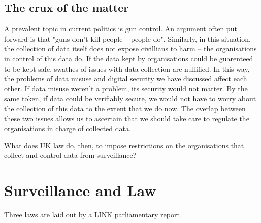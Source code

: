 \documentclass[10pt, draft]{article}
\begin{document}
\subsection{The crux of the matter}\par
A prevalent topic in current politics is gun control. An argument often put forward is that "guns don't kill people -- people do". Similarly, in this situation, the collection of data itself does not expose civillians to harm -- the organisations in control of this data do. If the data kept by organisations could be guarenteed to be kept safe, swathes of issues with data collection are nullified. In this way, the problems of data misuse and digital security we have discussed affect each other. If data misuse weren't a problem, its security would not matter. By the same token, if data could be verifiably secure, we would not have to worry about the collection of this data to the extent that we do now. The overlap between these two issues allows us to ascertain that we should take care to regulate the organisations in charge of collected data. \par
What does UK law do, then, to impose restrictions on the organisations that collect and control data from surveillance?

\section{Surveillance and Law}\par
Three laws are laid out by a \href{http://www.parliament.uk/business/publications/research/key-issues-for-the-new-parliament/security-and-liberty/surveillance-society/}{ LINK }parliamentary report
\end{document}
